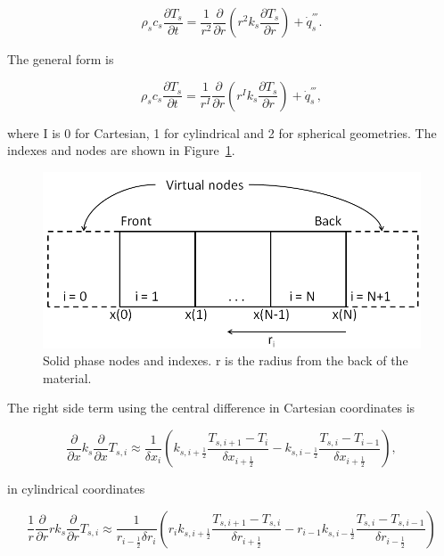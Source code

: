\begin{equation}
\label{heat_cond_spher}
     \rho_s c_s \frac{\partial T_s}{\partial t} = \frac{1}{r^2}\frac{\partial}{\partial r} (r^2 k_s \frac{\partial T_s}{\partial r}) + \dot{q}^{'''}_s.
\end{equation}

The general form is

\begin{equation}
\label{heat_cond_cyl2}
     \rho_s c_s \frac{\partial T_s}{\partial t} = \frac{1}{r^I}\frac{\partial}{\partial r} (r^I k_s \frac{\partial T_s}{\partial r}) + \dot{q}^{'''}_s,
\end{equation}

where I is 0 for Cartesian, 1 for cylindrical and 2 for spherical geometries. The indexes and nodes are shown in Figure~\ref{fig_solid_nodes}.

\begin{figure}[ht]
    \centering
    \includegraphics[width=5.0in]{FIGURES/appendix_I_solid_nodes.png}
    \caption{Solid phase nodes and indexes. r is the radius from the back of the material.}
    \label{fig_solid_nodes}
\end{figure}

The right side term using the central difference in Cartesian coordinates is

\begin{equation}
\label{T_cart}
    \frac{\partial}{\partial x} k_s \frac{\partial}{\partial x} T_{s,i}
    \approx \frac{1}{\delta x_i}(k_{s,i+\frac{1}{2}}\frac{T_{s,i+1}-T_{i}}{\delta x_{i+\frac{1}{2}}}-k_{s, i-\frac{1}{2}}\frac{T_{s,i}-T_{i-1}}{\delta x_{i+\frac{1}{2}}}),
\end{equation}

in cylindrical coordinates

\begin{equation}
\label{T_cyl}
    \frac{1}{r}\frac{\partial}{\partial r} rk_s \frac{\partial}{\partial r} T_{s,i}
    \approx \frac{1}{r_{i-\frac{1}{2}} \delta r_i}(r_{i}k_{s,i+\frac{1}{2}}\frac{T_{s,i+1}-T_{s,i}}{\delta r_{i+\frac{1}{2}}}-r_{i-1}k_{s,i-\frac{1}{2}}\frac{T_{s,i}-T_{s,i-1}}{\delta r_{i-\frac{1}{2}}})
\end{equation}

